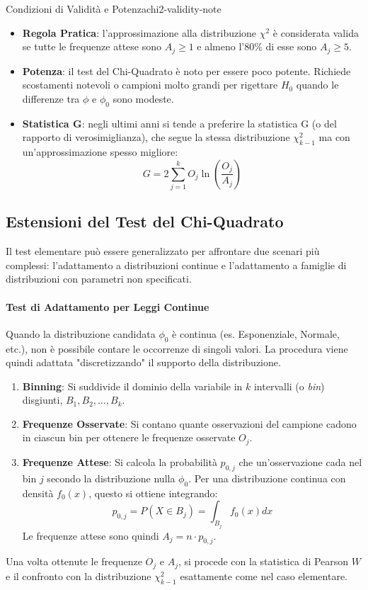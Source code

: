\begin{nota}{Condizioni di Validità e Potenza}{chi2-validity-note}
\begin{itemize}
    \item \textbf{Regola Pratica}: l'approssimazione alla distribuzione
    \(\chi^2\) è considerata valida se tutte le frequenze attese sono \(A_j \ge
    1\) e almeno l'80\% di esse sono \(A_j \ge 5\).
    \item \textbf{Potenza}: il test del Chi-Quadrato è noto per essere poco
    potente. Richiede scostamenti notevoli o campioni molto grandi per rigettare
    \(H_0\) quando le differenze tra \(\phi\) e \(\phi_0\) sono modeste.
    \item \textbf{Statistica G}: negli ultimi anni si tende a preferire la
    statistica G (o del rapporto di verosimiglianza), che segue la stessa
    distribuzione \(\chi^2_{k-1}\) ma con un'approssimazione spesso migliore:
    \[ G = 2 \sum_{j=1}^{k} O_j \ln\left(\frac{O_j}{A_j}\right) \]
\end{itemize}
\end{nota}

\subsection{Estensioni del Test del Chi-Quadrato}
Il test elementare può essere generalizzato per affrontare due scenari più
complessi: l'adattamento a distribuzioni continue e l'adattamento a famiglie di
distribuzioni con parametri non specificati.

\paragraph{Test di Adattamento per Leggi Continue}
Quando la distribuzione candidata \(\phi_0\) è continua (es. Esponenziale,
Normale, etc.), non è possibile contare le occorrenze di singoli valori. La
procedura viene quindi adattata "discretizzando" il supporto della
distribuzione.

\begin{enumerate}
    \item \textbf{Binning}: Si suddivide il dominio della variabile in \(k\)
    intervalli (o \textit{bin}) disgiunti, \(B_1, B_2, \dots, B_k\).
    \item \textbf{Frequenze Osservate}: Si contano quante osservazioni del
    campione cadono in ciascun bin per ottenere le frequenze osservate \(O_j\).
    \item \textbf{Frequenze Attese}: Si calcola la probabilità \(p_{0,j}\) che
    un'osservazione cada nel bin \(j\) secondo la distribuzione nulla
    \(\phi_0\). Per una distribuzione continua con densità \(f_0(x)\), questo
    si ottiene integrando:
    \[ p_{0,j} = P(X \in B_j) = \int_{B_j} f_0(x) dx \]
    Le frequenze attese sono quindi \(A_j = n \cdot p_{0,j}\).
\end{enumerate}
Una volta ottenute le frequenze \(O_j\) e \(A_j\), si procede con la statistica
di Pearson \(W\) e il confronto con la distribuzione \(\chi^2_{k-1}\)
esattamente come nel caso elementare.

